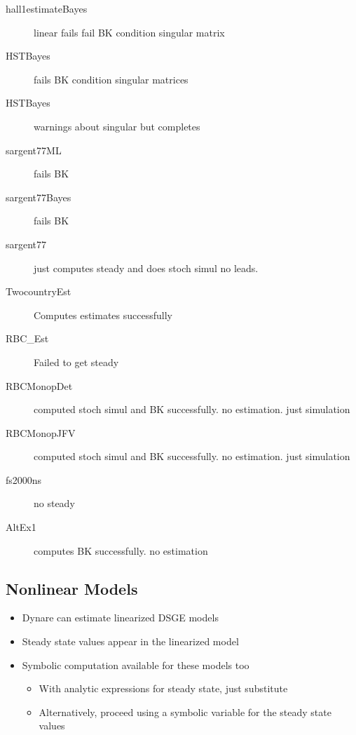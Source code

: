 \documentclass[12pt]{elsart}
\begin{document}
\begin{description}
\item[hall1estimateBayes] linear fails fail BK condition   singular matrix
\item[HSTBayes] fails BK condition singular matrices  
\item[HSTBayes] warnings about singular but completes
\item[sargent77ML] fails BK
\item[sargent77Bayes] fails BK
\item[sargent77] just computes steady and does stoch simul  no leads.
\item[TwocountryEst] Computes estimates successfully
\item[RBC\_Est] Failed to get steady
\item[RBCMonopDet] computed stoch simul and BK successfully. no estimation. just simulation
\item[RBCMonopJFV] computed stoch simul and BK successfully. no estimation. just simulation
  \item[fs2000ns] no steady
  \item[AltEx1] computes BK successfully. no estimation
\end{description}

\vspace{1cm}


  \subsection{Nonlinear Models}
  \begin{itemize}
  \item Dynare can estimate linearized DSGE models
  \item Steady state values appear in the linearized model
  \item Symbolic computation available for these models too
      \begin{itemize}
      \item With analytic expressions for steady state, just substitute
      \item Alternatively, proceed using  a symbolic variable for the 
        steady state values
      \end{itemize}
  \end{itemize}
\end{document}
